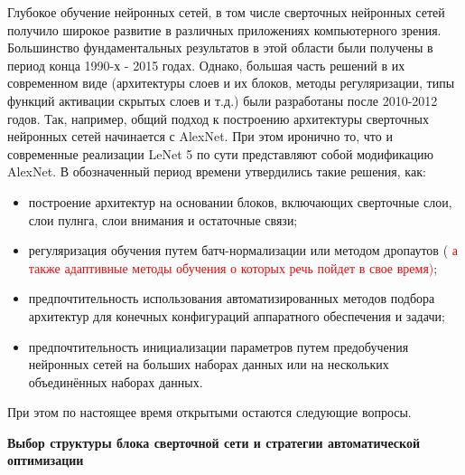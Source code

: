 \documentclass[12pt]{article}
\begin{document}
\begin{sloppypar}
Глубокое обучение нейронных сетей, в том числе сверточных нейронных сетей получило широкое развитие в различных приложениях компьютерного зрения. Большинство фундаментальных результатов в этой области были получены в период конца 1990-х - 2015 годах. Однако, большая часть решений в их современном виде (архитектуры слоев и их блоков, методы регуляризации, типы функций активации скрытых слоев и т.д.) были разработаны после 2010-2012 годов. Так, например, общий подход к построению архитектуры сверточных нейронных сетей начинается с AlexNet. При этом иронично то, что и современные реализации LeNet 5 по сути представляют собой модификацию AlexNet.
В обозначенный период времени утвердились такие решения, как:
\begin{itemize} \itemsep 0.1em 
    \item построение архитектур на основании блоков, включающих сверточные слои, слои пулнга, слои внимания и остаточные связи; 
    \item регуляризация обучения путем батч-нормализации или методом дропаутов (
    \textcolor{red}{а также адаптивные методы обучения о которых речь пойдет в свое время)}; 
    \item предпочтительность использования автоматизированных методов подбора архитектур для конечных конфигураций аппаратного обеспечения и задачи;
    \item предпочтительность инициализации параметров путем предобучения нейронных сетей на больших наборах данных или на нескольких объединённых наборах данных.  
\end{itemize}

\noindent При этом по настоящее время открытыми остаются следующие вопросы.
\newline

\noindent\textbf{Выбор структуры блока сверточной сети и стратегии автоматической оптимизации}


\end{sloppypar}
\end{document}
